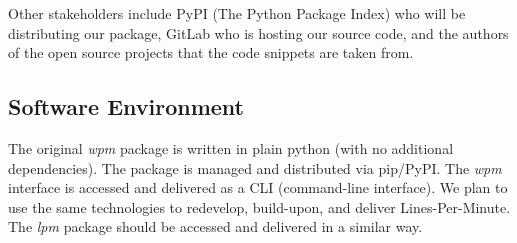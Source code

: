 \documentclass{article}
\begin{document}
Other stakeholders include PyPI (The Python Package Index) who will be distributing our package, GitLab who is hosting our source code, and the authors of the open source projects that the code snippets are taken from.

\subsection*{Software Environment}
The original \textit{wpm} package is written in plain python (with no additional dependencies). The package is managed and distributed via pip/PyPI. The \textit{wpm} interface is accessed and delivered as a CLI (command-line interface). We plan to use the same technologies to redevelop, build-upon, and deliver Lines-Per-Minute. The \textit{lpm} package should be accessed and delivered in a similar way.
\newpage
\end{document}
